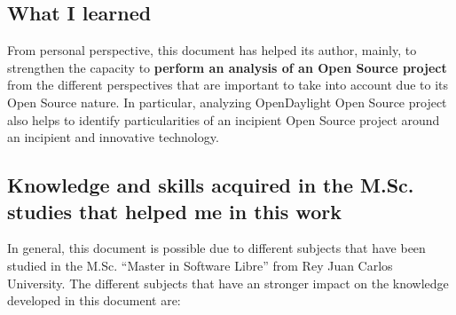 \documentclass[a4paper, 12pt]{book}
\begin{document}
\subsection{What I learned}
From personal perspective, this document has helped its author, mainly, to strengthen the capacity to \textbf{perform an analysis of an Open Source project} from the different perspectives that are important to take into account due to its Open Source nature. In particular, analyzing OpenDaylight Open Source project also helps to identify particularities of an incipient Open Source project around an incipient and innovative technology.

\subsection{Knowledge and skills acquired in the M.Sc. studies that helped me in this work}
In general, this document is possible due to different subjects that have been studied in the M.Sc. ``Master in Software Libre'' from Rey Juan Carlos University. The different subjects that have an stronger impact on the knowledge developed in this document are:
\end{document}
